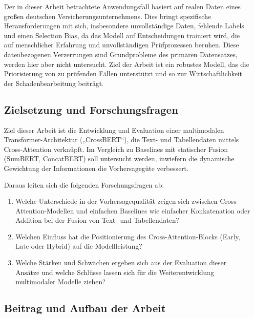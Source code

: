 Der in dieser Arbeit betrachtete Anwendungsfall basiert auf realen Daten eines großen deutschen Versicherungsunternehmens. Dies bringt spezifische Herausforderungen mit sich, insbesondere unvollständige Daten, fehlende Labels und einen Selection Bias, da das Modell auf Entscheidungen trainiert wird, die auf menschlicher Erfahrung und unvollständigen Prüfprozessen beruhen. Diese datenbezogenen Verzerrungen sind Grundprobleme des primären Datensatzes, werden hier aber nicht untersucht. Ziel der Arbeit ist ein robustes Modell, das die Priorisierung von zu prüfenden Fällen unterstützt und so zur Wirtschaftlichkeit der Schadenbearbeitung beiträgt.

\subsection{Zielsetzung und Forschungsfragen}

Ziel dieser Arbeit ist die Entwicklung und Evaluation einer multimodalen Transformer-Architektur („CrossBERT“), die Text- und Tabellendaten mittels Cross-Attention verknüpft. Im Vergleich zu Baselines mit statischer Fusion (SumBERT, ConcatBERT) soll untersucht werden, inwiefern die dynamische Gewichtung der Informationen die Vorhersagegüte verbessert.

Daraus leiten sich die folgenden Forschungsfragen ab:
\begin{enumerate}
    \item Welche Unterschiede in der Vorhersagequalität zeigen sich zwischen Cross-Attention-Modellen und einfachen Baselines wie einfacher Konkatenation oder Addition bei der Fusion von Text- und Tabellendaten?
    \item Welchen Einfluss hat die Positionierung des Cross-Attention-Blocks (Early, Late oder Hybrid) auf die Modellleistung?
    \item Welche Stärken und Schwächen ergeben sich aus der Evaluation dieser Ansätze und welche Schlüsse lassen sich für die Weiterentwicklung multimodaler Modelle ziehen?
\end{enumerate}

\subsection{Beitrag und Aufbau der Arbeit}

